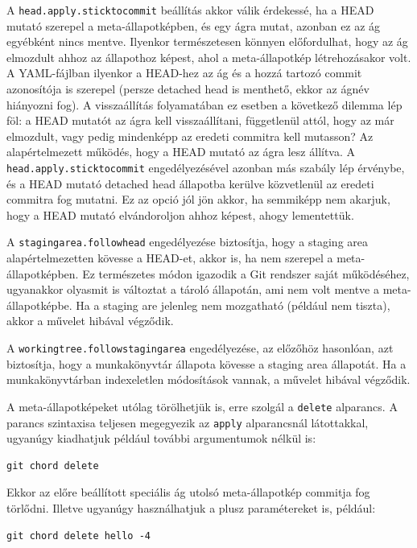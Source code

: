 \documentclass[
]{elteikthesis}[2025/03/25]
\begin{document}
A \verb|head.apply.sticktocommit| beállítás akkor válik érdekessé,
ha a HEAD mutató szerepel a meta-állapotképben, és egy ágra mutat,
azonban ez az ág egyébként nincs mentve.
Ilyenkor természetesen könnyen előfordulhat, hogy az ág elmozdult ahhoz az állapothoz képest,
ahol a meta-állapotkép létrehozásakor volt.
A YAML-fájlban ilyenkor a HEAD-hez az ág és a hozzá tartozó commit azonosítója is szerepel
(persze detached head is menthető, ekkor az ágnév hiányozni fog).
A visszaállítás folyamatában ez esetben a következő dilemma lép föl:
a HEAD mutatót az ágra kell visszaállítani, függetlenül attól, hogy az már elmozdult,
vagy pedig mindenképp az eredeti commitra kell mutasson?
Az alapértelmezett működés, hogy a HEAD mutató az ágra lesz állítva.
A \verb|head.apply.sticktocommit| engedélyezésével azonban más szabály lép érvénybe,
és a HEAD mutató detached head állapotba kerülve közvetlenül az eredeti commitra fog mutatni.
Ez az opció jól jön akkor, ha semmiképp nem akarjuk,
hogy a HEAD mutató elvándoroljon ahhoz képest, ahogy lementettük.

A \verb|stagingarea.followhead| engedélyezése biztosítja,
hogy a staging area alapértelmezetten kövesse a HEAD-et, akkor is, ha nem szerepel a meta-állapotképben.
Ez természetes módon igazodik a Git rendszer saját működéséhez,
ugyanakkor olyasmit is változtat a tároló állapotán, ami nem volt mentve a meta-állapotképbe.
Ha a staging are jelenleg nem mozgatható (például nem tiszta),
akkor a művelet hibával végződik.

A \verb|workingtree.followstagingarea| engedélyezése, az előzőhöz hasonlóan,
azt biztosítja, hogy a munkakönyvtár állapota kövesse a staging area állapotát.
Ha a munkakönyvtárban indexeletlen módosítások vannak,
a művelet hibával végződik.

A meta-állapotképeket utólag törölhetjük is, erre szolgál a \verb|delete| alparancs.
A parancs szintaxisa teljesen megegyezik az \verb|apply| alparancsnál látottakkal,
ugyanúgy kiadhatjuk például további argumentumok nélkül is:

\begin{verbatim}
git chord delete
\end{verbatim}

Ekkor az előre beállított speciális ág utolsó meta-állapotkép commitja fog törlődni.
Illetve ugyanúgy használhatjuk a plusz paramétereket is, például:

\begin{verbatim}
git chord delete hello -4
\end{verbatim}
\end{document}
